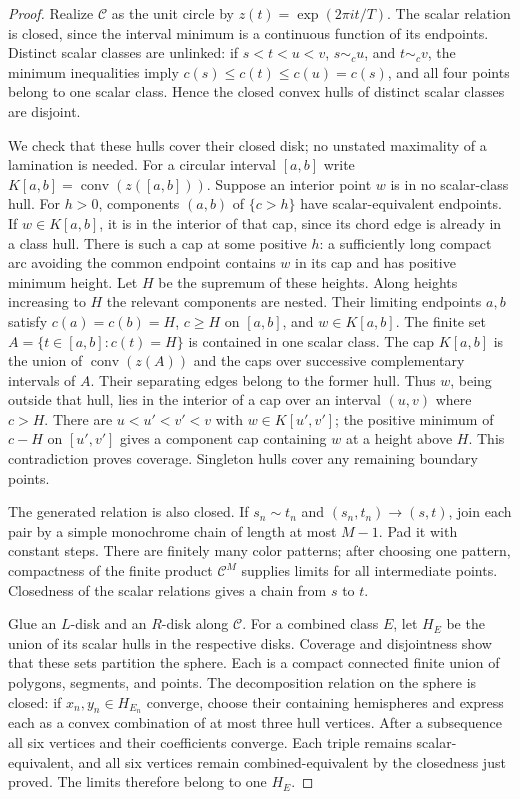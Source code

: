 \begin{proof}
Realize $\mathcal C$ as the unit circle by $z(t)=\exp(2\pi i t/T)$.  The
scalar relation is closed, since the interval minimum is a continuous
function of its endpoints.  Distinct scalar classes are unlinked: if
$s<t<u<v$, $s\sim_c u$, and $t\sim_c v$, the minimum inequalities imply
$c(s)\le c(t)\le c(u)=c(s)$, and all four points belong to one scalar
class.  Hence the closed convex hulls of distinct scalar classes are
disjoint.

We check that these hulls cover their closed disk; no unstated maximality
of a lamination is needed.  For a circular interval $[a,b]$ write
$K[a,b]=\operatorname{conv}(z([a,b]))$.  Suppose an interior point $w$ is
in no scalar-class hull.  For $h>0$, components $(a,b)$ of $\{c>h\}$ have
scalar-equivalent endpoints.  If $w\in K[a,b]$, it is in the interior of
that cap, since its chord edge is already in a class hull.  There is such
a cap at some positive $h$: a sufficiently long compact arc avoiding the
common endpoint contains $w$ in its cap and has positive minimum height.
Let $H$ be the supremum of these heights.  Along heights increasing to
$H$ the relevant components are nested.  Their limiting endpoints $a,b$
satisfy $c(a)=c(b)=H$, $c\ge H$ on $[a,b]$, and $w\in K[a,b]$.
The finite set $A=\{t\in[a,b]:c(t)=H\}$ is contained in one scalar class.
The cap $K[a,b]$ is the union of $\operatorname{conv}(z(A))$ and the caps
over successive complementary intervals of $A$.  Their separating edges
belong to the former hull.  Thus $w$, being outside that hull, lies in the
interior of a cap over an interval $(u,v)$ where $c>H$.  There are
$u<u'<v'<v$ with $w\in K[u',v']$; the positive minimum of $c-H$ on
$[u',v']$ gives a component cap containing $w$ at a height above $H$.
This contradiction proves coverage.  Singleton hulls cover any remaining
boundary points.

The generated relation is also closed.  If $s_n\sim t_n$ and
$(s_n,t_n)\to(s,t)$, join each pair by a simple monochrome chain of length
at most $M-1$.  Pad it with constant steps.  There are finitely many color
patterns; after choosing one pattern, compactness of the finite product
$\mathcal C^M$ supplies limits for all intermediate points.  Closedness of
the scalar relations gives a chain from $s$ to $t$.

Glue an $L$-disk and an $R$-disk along $\mathcal C$.  For a combined class
$E$, let $H_E$ be the union of its scalar hulls in the respective disks.
Coverage and disjointness show that these sets partition the sphere.
Each is a compact connected finite union of polygons, segments, and
points.  The decomposition relation on the sphere is closed: if
$x_n,y_n\in H_{E_n}$ converge, choose their containing hemispheres and
express each as a convex combination of at most three hull vertices.
After a subsequence all six vertices and their coefficients converge.
Each triple remains scalar-equivalent, and all six vertices remain
combined-equivalent by the closedness just proved.  The limits therefore
belong to one $H_E$.


\end{proof}
